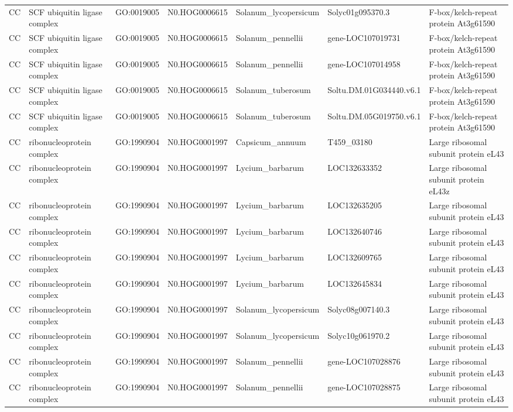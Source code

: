 \begin{table}
\begin{tabular}[t]{lllllll}
CC & SCF ubiquitin ligase complex & GO:0019005 & N0.HOG0006615 & Solanum\_lycopersicum & Solyc01g095370.3 & F-box/kelch-repeat protein At3g61590\\
CC & SCF ubiquitin ligase complex & GO:0019005 & N0.HOG0006615 & Solanum\_pennellii & gene-LOC107019731 & F-box/kelch-repeat protein At3g61590\\
CC & SCF ubiquitin ligase complex & GO:0019005 & N0.HOG0006615 & Solanum\_pennellii & gene-LOC107014958 & F-box/kelch-repeat protein At3g61590\\
CC & SCF ubiquitin ligase complex & GO:0019005 & N0.HOG0006615 & Solanum\_tuberosum & Soltu.DM.01G034440.v6.1 & F-box/kelch-repeat protein At3g61590\\
CC & SCF ubiquitin ligase complex & GO:0019005 & N0.HOG0006615 & Solanum\_tuberosum & Soltu.DM.05G019750.v6.1 & F-box/kelch-repeat protein At3g61590\\
CC & ribonucleoprotein complex & GO:1990904 & N0.HOG0001997 & Capsicum\_annuum & T459\_03180 & Large ribosomal subunit protein eL43\\
CC & ribonucleoprotein complex & GO:1990904 & N0.HOG0001997 & Lycium\_barbarum & LOC132633352 & Large ribosomal subunit protein eL43z\\
CC & ribonucleoprotein complex & GO:1990904 & N0.HOG0001997 & Lycium\_barbarum & LOC132635205 & Large ribosomal subunit protein eL43\\
CC & ribonucleoprotein complex & GO:1990904 & N0.HOG0001997 & Lycium\_barbarum & LOC132640746 & Large ribosomal subunit protein eL43\\
CC & ribonucleoprotein complex & GO:1990904 & N0.HOG0001997 & Lycium\_barbarum & LOC132609765 & Large ribosomal subunit protein eL43\\
CC & ribonucleoprotein complex & GO:1990904 & N0.HOG0001997 & Lycium\_barbarum & LOC132645834 & Large ribosomal subunit protein eL43\\
CC & ribonucleoprotein complex & GO:1990904 & N0.HOG0001997 & Solanum\_lycopersicum & Solyc08g007140.3 & Large ribosomal subunit protein eL43\\
CC & ribonucleoprotein complex & GO:1990904 & N0.HOG0001997 & Solanum\_lycopersicum & Solyc10g061970.2 & Large ribosomal subunit protein eL43\\
CC & ribonucleoprotein complex & GO:1990904 & N0.HOG0001997 & Solanum\_pennellii & gene-LOC107028876 & Large ribosomal subunit protein eL43\\
CC & ribonucleoprotein complex & GO:1990904 & N0.HOG0001997 & Solanum\_pennellii & gene-LOC107028875 & Large ribosomal subunit protein eL43\\

\end{tabular}
\end{table}
